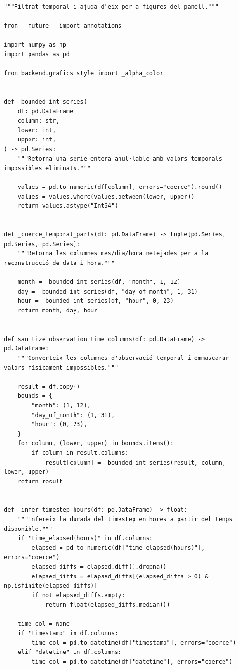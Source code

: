 \documentclass[10pt,a4paper]{article}
\begin{document}
\begin{lstlisting}[style=studioPython,caption={backend/grafics/time\_utils.py},label={lst:backend-grafics-time-utils-py}]
"""Filtrat temporal i ajuda d'eix per a figures del panell."""

from __future__ import annotations

import numpy as np
import pandas as pd

from backend.grafics.style import _alpha_color


def _bounded_int_series(
    df: pd.DataFrame,
    column: str,
    lower: int,
    upper: int,
) -> pd.Series:
    """Retorna una sèrie entera anul·lable amb valors temporals impossibles eliminats."""

    values = pd.to_numeric(df[column], errors="coerce").round()
    values = values.where(values.between(lower, upper))
    return values.astype("Int64")


def _coerce_temporal_parts(df: pd.DataFrame) -> tuple[pd.Series, pd.Series, pd.Series]:
    """Retorna les columnes mes/dia/hora netejades per a la reconstrucció de data i hora."""

    month = _bounded_int_series(df, "month", 1, 12)
    day = _bounded_int_series(df, "day_of_month", 1, 31)
    hour = _bounded_int_series(df, "hour", 0, 23)
    return month, day, hour


def sanitize_observation_time_columns(df: pd.DataFrame) -> pd.DataFrame:
    """Converteix les columnes d'observació temporal i emmascarar valors físicament impossibles."""

    result = df.copy()
    bounds = {
        "month": (1, 12),
        "day_of_month": (1, 31),
        "hour": (0, 23),
    }
    for column, (lower, upper) in bounds.items():
        if column in result.columns:
            result[column] = _bounded_int_series(result, column, lower, upper)
    return result


def _infer_timestep_hours(df: pd.DataFrame) -> float:
    """Infereix la durada del timestep en hores a partir del temps disponible."""
    if "time_elapsed(hours)" in df.columns:
        elapsed = pd.to_numeric(df["time_elapsed(hours)"], errors="coerce")
        elapsed_diffs = elapsed.diff().dropna()
        elapsed_diffs = elapsed_diffs[(elapsed_diffs > 0) & np.isfinite(elapsed_diffs)]
        if not elapsed_diffs.empty:
            return float(elapsed_diffs.median())

    time_col = None
    if "timestamp" in df.columns:
        time_col = pd.to_datetime(df["timestamp"], errors="coerce")
    elif "datetime" in df.columns:
        time_col = pd.to_datetime(df["datetime"], errors="coerce")


\end{lstlisting}
\end{document}
